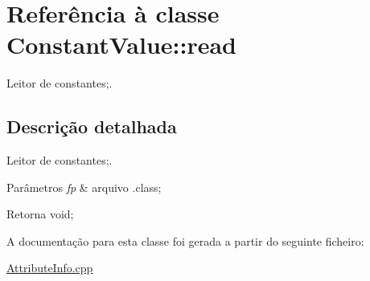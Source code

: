 \hypertarget{class_constant_value_1_1read}{}\section{Referência à classe Constant\+Value\+:\+:read}
\label{class_constant_value_1_1read}


Leitor de constantes;.  




\subsection{Descrição detalhada}
Leitor de constantes;. 


\begin{DoxyParams}{Parâmetros}
{\em fp} & arquivo .class; \\
\hline
\end{DoxyParams}
\begin{DoxyReturn}{Retorna}
void; 
\end{DoxyReturn}


A documentação para esta classe foi gerada a partir do seguinte ficheiro\+:\begin{DoxyCompactItemize}
\item 
\hyperlink{_attribute_info_8cpp}{Attribute\+Info.\+cpp}\end{DoxyCompactItemize}
